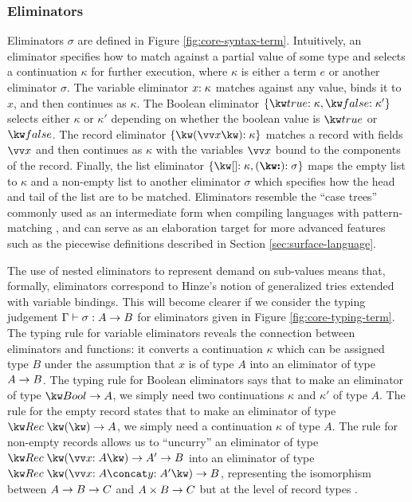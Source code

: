 \subsubsection{Eliminators}
\label{sssec:syntax-eliminator}
Eliminators $\sigma$ are defined in Figure \ref{fig:core-syntax-term}. Intuitively, an eliminator specifies how to match against a partial value of some type and selects a continuation $\kappa$ for further execution, where $\kappa$ is either a term $e$ or another eliminator $\sigma$. The variable eliminator ${x}{:}\;{\kappa}$ matches against any value, binds it to $x$, and then continues as $\kappa$. The Boolean eliminator $\elimBool{\kappa}{\kappa'}$ selects either $\kappa$ or $\kappa'$ depending on whether the boolean value is $\exTrue$ or $\exFalse$. The record eliminator $\elimRec{\seq{x}}{\kappa}$ matches a record with fields $\seq{x}$ and then continues as $\kappa$ with the variables $\seq{x}$ bound to the components of the record. Finally, the list eliminator $\elimList{\kappa}{\sigma}$ maps the empty list to $\kappa$ and a non-empty list to another eliminator $\sigma$ which specifies how the head and tail of the list are to be matched. Eliminators resemble the ``case trees'' commonly used as an intermediate form when compiling languages with pattern-matching \cite{graf20}, and can serve as an elaboration target for more advanced features such as the piecewise definitions described in Section \ref{sec:surface-language}.

The use of nested eliminators to represent demand on sub-values means that, formally, eliminators correspond to Hinze's notion of generalized tries \cite{hinze00} extended with variable bindings. This will become clearer if we consider the typing judgement $\Gamma \vdash \sigma: {A}\rightarrow{B}$ for eliminators given in Figure \ref{fig:core-typing-term}. The typing rule for variable eliminators reveals the connection between eliminators and functions: it converts a continuation $\kappa$ which can be assigned type $B$ under the assumption that $x$ is of type $A$ into an eliminator of type ${A}\rightarrow{B}$. The typing rule for Boolean eliminators says that to make an eliminator of type $\tyFun{\tyBool}{A}$, we simply need two continuations $\kappa$ and $\kappa'$ of type $A$. The rule for the empty record states that to make an eliminator of type $\tyFun{\tyRec{}}{A}$, we simply need a continuation $\kappa$ of type $A$. The rule for non-empty records allows us to ``uncurry'' an eliminator of type $\tyFun{\tyRec{\vec{\bind{x}{A}}}}{\tyFun{A'}{B}}$ into an eliminator of type $\tyFun{\tyRec{\vec{\bind{x}{A}} \concat \bind{y}{A'}}}{B}$, representing the isomorphism between ${{A}\rightarrow{B}}\rightarrow{C}$ and ${{A}\times{B}}\rightarrow{C}$ but at the level of record types \cite{hinze00}. 

